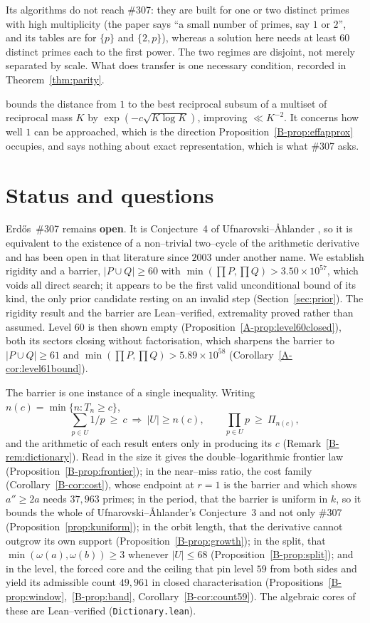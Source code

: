 \documentclass[11pt]{article}
\theoremstyle{definition}
\begin{document}
Its algorithms do not reach \#307: they are built for one or two distinct primes with high
multiplicity \textup{(}the paper says ``a small number of primes, say $1$ or $2$'', and its tables
are for $\{p\}$ and $\{2,p\}$\textup{)}, whereas a solution here needs at least $60$ distinct primes
each to the first power. The two regimes are disjoint, not merely separated by scale. What does
transfer is one necessary condition, recorded in Theorem~\ref{thm:parity}.

\cite{StretchedEG2026} bounds the distance from $1$ to the best reciprocal subsum of a multiset of
reciprocal mass $K$ by $\exp(-c\sqrt{K\log K})$, improving $\ll K^{-2}$. It concerns how well $1$
can be approached, which is the direction Proposition~\ref{B-prop:effapprox} occupies, and says
nothing about exact representation, which is what \#307 asks.


\section{Status and questions}\label{sec:status}

Erd\H{o}s~\#307 remains \textbf{open}. It is Conjecture~4 of Ufnarovski--\AA hlander
\cite{UfnarovskiAhlander2003}, so it is equivalent to the existence of a non--trivial two--cycle of
the arithmetic derivative and has been open in that literature since $2003$ under another name. We
establish rigidity and a barrier, $|P\cup Q|\ge60$ with $\min(\prod P,\prod Q)>3.50\times10^{57}$,
which voids all direct search; it appears to be the first valid unconditional bound of its kind,
the only prior candidate resting on an invalid step (Section~\ref{sec:prior}). The rigidity result
and the barrier are Lean--verified, extremality proved rather than assumed. Level $60$ is then shown empty
(Proposition~\ref{A-prop:level60closed}), both its sectors closing without factorisation, which sharpens the barrier to
$|P\cup Q|\ge61$ and $\min(\prod P,\prod Q)>5.89\times10^{58}$ (Corollary~\ref{A-cor:level61bound}).

The barrier is one instance of a single inequality. Writing $n(c)=\min\{n:T_n\ge c\}$,
\[ \sum_{p\in U}1/p\ \ge\ c\ \Longrightarrow\ |U|\ge n(c),\qquad \prod_{p\in U}p\ \ge\ \Pi_{n(c)}, \]
and the arithmetic of each result enters only in producing its $c$ (Remark~\ref{B-rem:dictionary}).
Read in the size it gives the double--logarithmic frontier law
(Proposition~\ref{B-prop:frontier}); in the near--miss ratio, the cost family
(Corollary~\ref{B-cor:cost}), whose endpoint at $r=1$ is the barrier and which shows $a''\ge2a$ needs
$37{,}963$ primes; in the period, that the barrier is uniform in $k$, so it bounds the whole of
Ufnarovski--\AA hlander's Conjecture~3 and not only \#307 (Proposition~\ref{prop:kuniform}); in the
orbit length, that the derivative cannot outgrow its own support
(Proposition~\ref{B-prop:growth}); in the split, that $\min(\omega(a),\omega(b))\ge3$ whenever
$|U|\le68$ (Proposition~\ref{B-prop:split}); and in the level, the forced core and the ceiling that
pin level $59$ from both sides and yield its admissible count $49{,}961$ in closed characterisation
(Propositions~\ref{B-prop:window},~\ref{B-prop:band}, Corollary~\ref{B-cor:count59}). The algebraic cores
of these are Lean--verified (\texttt{Dictionary.lean}).
\end{document}
